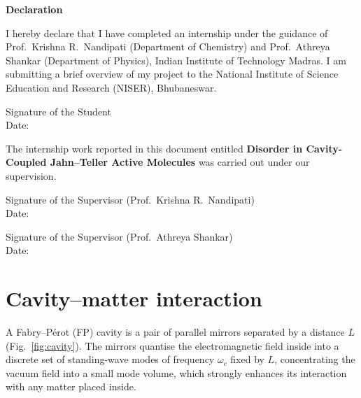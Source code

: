 \documentclass[12pt,a4paper]{article}
\begin{document}
\thispagestyle{empty}
\vspace*{2cm}
\begin{center}
{\LARGE\bfseries Declaration}
\end{center}
\vspace{2em}
\noindent
I hereby declare that I have completed an internship under the guidance of
Prof.\ Krishna R.\ Nandipati (Department of Chemistry) and Prof.\ Athreya
Shankar (Department of Physics), Indian Institute of Technology Madras. I am
submitting a brief overview of my project to the National Institute of
Science Education and Research (NISER), Bhubaneswar.

\vspace{3em}
\begin{flushright}
Signature of the Student\\
Date:
\end{flushright}

\vspace{3em}
\noindent
The internship work reported in this document entitled \textbf{Disorder in
Cavity-Coupled Jahn--Teller Active Molecules} was carried out under our
supervision.

\vspace{3em}
\begin{flushright}
Signature of the Supervisor (Prof.\ Krishna R.\ Nandipati)\\
Date:
\end{flushright}

\vspace{2.5em}
\begin{flushright}
Signature of the Supervisor (Prof.\ Athreya Shankar)\\
Date:
\end{flushright}

\newpage

\thispagestyle{empty}

\section{Cavity--matter interaction}\label{sec:cavity}

A Fabry--P\'erot (FP) cavity is a pair of parallel mirrors separated by a
distance $L$ (Fig.~\ref{fig:cavity}). The mirrors quantise the electromagnetic
field inside into a discrete set of standing-wave modes of frequency
$\omega_c$ fixed by $L$, concentrating the vacuum field into a small mode
volume, which strongly enhances its interaction with any matter placed
inside.
\end{document}
